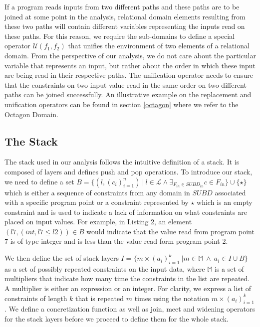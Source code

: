 \documentclass[10pt]{report}
\begin{document}
 
If a program reads inputs from two different paths and these paths are to be joined at some point in the analysis, relational domain elements resulting from these two paths will contain different variables representing the inputs read on these paths. For this reason, we require the sub-domains to define a special operator $ \mathcal{U}(f_{1}, f_{2}) $ that unifies the environment of two elements of a relational domain. From the perspective of our analysis, we do not care about the particular variable that represents an input, but rather about the order in which these input are being read in their respective paths. The unification operator needs to ensure that the constraints on two input value read in the same order on two different paths can be joined successfully. An illustrative example on the replacement and unification operators can be found in section \ref{octagon} where we refer to the Octagon Domain.

\subsection{The Stack} \label{stack}

The stack used in our analysis follows the intuitive definition of a stack. It is composed of layers and defines push and pop operations. To introduce our stack, we need to define a set $B = \lbrace (l, (c_{i})_{i=1}^{n})\ \vert \ l \in \mathcal{L} \wedge \exists_{F_{in} \in SUBD_{in}} c \in F_{in} \rbrace \cup \lbrace \star \rbrace$ which is either a sequence of constraints from any domain in $SUBD$ associated with a specific program point or a constraint represented by $ \star $ which is an empty constraint and is used to indicate a lack of information on what constraints are placed on input values. For example, in Listing 2, an element $(l7, (int, l7 \leq l2)) \in B$ would indicate that the value read from program point 7 is of type integer and is less than the value read form program point 2.

We then define the set of stack layers $I  = \lbrace  m \times (a_{i})_{i=1}^{k}\ \vert m \in \mathbb{M}\ \wedge \ a_{i} \in I \cup B \rbrace$ as a set of possibly repeated constraints on the input data, where $ \mathbb{M} $ is a set of multipliers that indicate how many time the constraints in the list are repeated. A multiplier is either an expression or an integer. For clarity, we express a list of constraints of length $ k $ that is repeated $ m $ times using the notation $ m \times (a_{i})_{i=1}^{k} $. We define a concretization function as well as join, meet and widening operators for the stack layers before we proceed to define them for the whole stack. 
\end{document}
